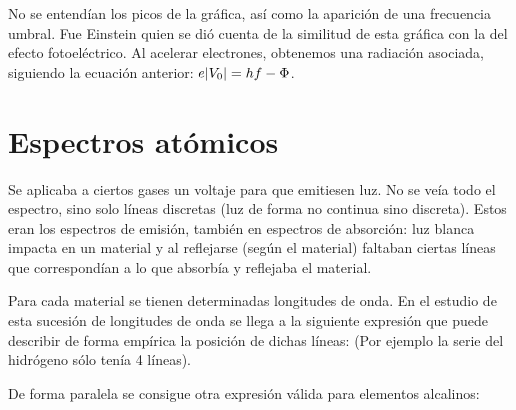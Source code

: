 \documentclass{report}
\begin{document}
    \vspace{0.4cm} \noindent No se entendían los picos de la gráfica, así como la aparición de una frecuencia umbral. Fue Einstein quien se dió cuenta de la 
    similitud de esta gráfica con la del efecto fotoeléctrico. Al acelerar electrones, obtenemos una radiación asociada, siguiendo
    la ecuación anterior: $e\lvert V_0\rvert=hf-\Phi$. 

  \section{Espectros atómicos}
    \noindent Se aplicaba a ciertos gases un voltaje para que emitiesen luz. No se veía todo el espectro, sino solo líneas discretas (luz de forma no continua sino discreta). 
    Estos eran los espectros de emisión, también en espectros de absorción: luz blanca impacta en un material y al reflejarse (según el material) faltaban ciertas 
    líneas que correspondían a lo que absorbía y reflejaba el material. 

    \vspace{0.4cm} \noindent Para cada material se tienen determinadas longitudes de onda. En el estudio de esta sucesión de longitudes de onda se llega a la siguiente expresión 
    que puede describir de forma empírica la posición de dichas líneas: (Por ejemplo la serie del hidrógeno sólo tenía 4 líneas).


    \vspace{0.4cm} \noindent De forma paralela se consigue otra expresión válida para elementos alcalinos:
\end{document}
